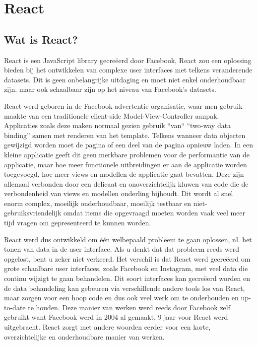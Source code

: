 \chapter{React}\label{ch:react}

\section{Wat is React?}\label{sec:what}
	
	React is een JavaScript library gecreëerd door Facebook, React zou een oplossing bieden bij het ontwikkelen van complexe user interfaces met telkens veranderende datasets. Dit is geen onbelangrijke uitdaging en moet niet enkel onderhoudbaar zijn, maar ook schaalbaar zijn op het niveau van Facebook’s datasets.
	
	React werd geboren in de Facebook advertentie organisatie, waar men gebruik maakte van een traditionele client-side Model-View-Controller aanpak. Applicaties zoals deze maken normaal gezien gebruik ``van`` ``two-way data binding'' samen met renderen van het template. Telkens wanneer data objecten gewijzigd worden moet de pagina of een deel van de pagina opnieuw laden. In een kleine applicatie geeft dit geen merkbare problemen voor de performantie van de applicatie, maar hoe meer functionele uitbreidingen er aan de applicatie worden toegevoegd, hoe meer views en modellen de applicatie gaat bevatten. Deze zijn allemaal verbonden door een delicaat en onoverzichtelijk kluwen van code die de verbondenheid van views en modellen onderling bijhoudt. Dit wordt al snel enorm complex, moeilijk onderhoudbaar, moeilijk testbaar en niet-gebruiksvriendelijk omdat items die opgevraagd moeten worden vaak veel meer tijd vragen om gepresenteerd te kunnen worden.
	
	React werd dus ontwikkeld om één welbepaald probleem te gaan oplossen, nl. het tonen van data in de user interface. Als u denkt dat dat probleem reeds werd opgelost, bent u zeker niet verkeerd. Het verschil is dat React werd gecreëerd om grote schaalbare user interfaces, zoals Facebook en Instagram, met veel data die continu wijzigt te gaan behandelen. Dit soort interfaces kan gecreëerd worden en de data behandeling kan gebeuren via verschillende andere tools los van React, maar zorgen voor een hoop code en dus ook veel werk om te onderhouden en up-to-date te houden. Deze manier van werken werd reeds door Facebook zelf gebruikt want Facebook werd in 2004 al gemaakt, 9 jaar voor React werd uitgebracht. React zorgt met andere woorden eerder voor een korte, overzichtelijke en onderhoudbare manier van werken.
	
